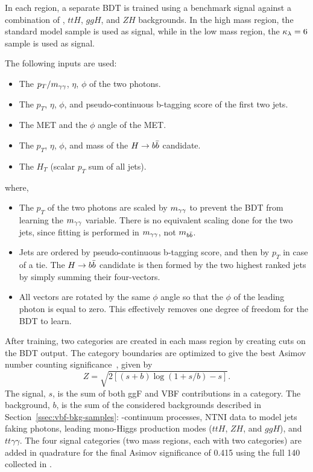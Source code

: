 In each region, a separate BDT is trained using a benchmark \HH signal against a combination of \yy, $ttH$, $ggH$, and $ZH$ backgrounds. In the high mass region, the standard model \HH sample is used as signal, while in the low mass region, the ${\kappa_{\lambda} = 6}$ sample is used as signal.

The following inputs are used:

\begin{itemize}
	\item{The $p_{T}/m_{\gamma\gamma}$, $\eta$, $\phi$ of the two photons.} 
	\item{The $p_{T}$, $\eta$, $\phi$, and pseudo-continuous b-tagging score of the first two jets.}
	\item{The MET and the $\phi$ angle of the MET.}
	\item{The $p_{T}$, $\eta$, $\phi$, and mass of the $H\rightarrow b\bar{b}$ candidate.}
	\item{The $H_{T}$ (scalar $p_{T}$ sum of all jets).}
\end{itemize}
where,
\begin{itemize}
	\item{The $p_{T}$ of the two photons are scaled by $m_{\gamma\gamma}$ to prevent the BDT from learning the $m_{\gamma\gamma}$ variable. There is no equivalent scaling done for the two jets, since fitting is performed in $m_{\gamma\gamma}$, not $m_{b\bar{b}}$.}
	\item{Jets are ordered by pseudo-continuous b-tagging score, and then by $p_{T}$ in case of a tie. The $H \rightarrow b\bar{b}$ candidate is then formed by the two highest ranked jets by simply summing their four-vectors.}
	\item{All vectors are rotated by the same $\phi$ angle so that the $\phi$ of the leading photon is equal to zero. This effectively removes one degree of freedom for the BDT to learn.}
\end{itemize}

After training, two categories are created in each mass region by creating cuts on the BDT output. The category boundaries are optimized to give the best Asimov number counting significance~\cite{asimov}, given by
\begin{equation}\label{eqn:asimov-significance}
    Z = \sqrt{2[(s+b)\log{(1 + s/b)} -s]}.
\end{equation}
The signal, $s$, is the sum of both ggF and VBF \hh contributions in a category. The background, $b$, is the sum of the considered backgrounds described in Section~\ref{ssec:vbf-bkg-samples}: \yy-continuum processes, \gls{NTNI} data to model jets faking photons, leading mono-Higgs production modes ($ttH$, $ZH$, and $ggH$), and $tt\gamma\gamma$. The four signal categories (two mass regions, each with two categories) are added in quadrature for the final Asimov significance of 0.415 using the full 140 \ifb collected in \RunTwo.


